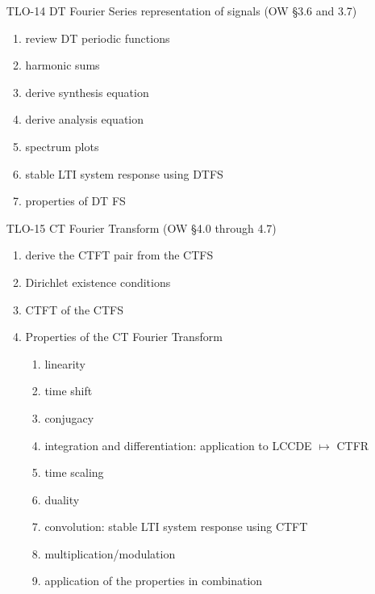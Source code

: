 \begin{enumerate}
\item[TLO-14] DT Fourier Series representation of signals  (OW \S 3.6 and 3.7)
  \begin{enumerate}
  \item review DT periodic functions
  \item harmonic sums
  \item derive synthesis equation
  \item derive analysis equation
  \item spectrum plots
  \item stable LTI system response using DTFS
  \item properties of DT FS
  \end{enumerate}
  
\item[TLO-15] CT Fourier Transform (OW \S 4.0 through 4.7)
  \begin{enumerate}
  \item derive the CTFT pair from the CTFS 
  \item Dirichlet existence conditions
  \item CTFT of the CTFS
  \item Properties of the CT Fourier Transform
    \begin{enumerate}
    \item linearity
    \item time shift
    \item conjugacy
    \item integration and differentiation: application to LCCDE $\mapsto$ CTFR
    \item time scaling
    \item duality
    \item convolution: stable LTI system response using CTFT
    \item multiplication/modulation
    \item application of the properties in combination
    \end{enumerate}
  \end{enumerate}


\end{enumerate}
